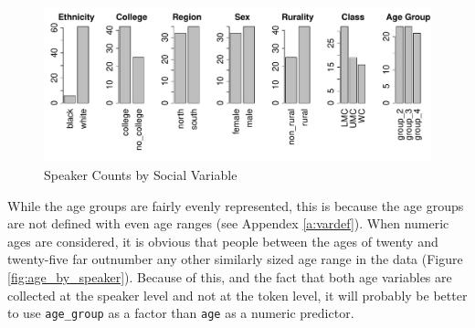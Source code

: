 \documentclass[a4paper]{article}
\begin{document}
\begin{figure}[ht]
  \begin{center}
\includegraphics{prelim-007}
  \end{center}
  \vspace{-20pt}
  \caption{Speaker Counts by Social Variable}
  \label{fig:social_by_speaker}
\end{figure}
\newpage
While the age groups are fairly evenly represented, this is because
the age groups are not defined with even age ranges (see Appendex
\ref{a:vardef}).  When numeric ages are considered, it is obvious that
people between the ages of twenty and twenty-five far outnumber any
other similarly sized age range in the data (Figure
\ref{fig:age_by_speaker}).  Because of this, and the fact that both
age variables are collected at the speaker level and not at the token
level, it will probably be better to use \texttt{age\_group} as a factor
than \texttt{age} as a numeric predictor.\vspace{-10pt}
\end{document}

